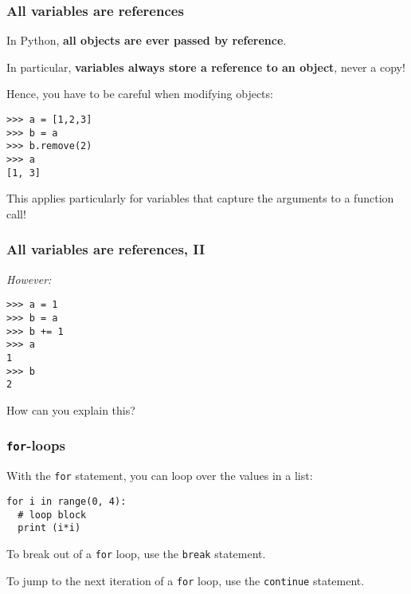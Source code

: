 \documentclass[english,serif,mathserif,xcolor=pdftex,dvipsnames,table]{beamer}
\begin{document}



\begin{frame}[fragile]
  \frametitle{All variables are references}

  In Python, \textbf{all objects are ever passed by reference}.

  \+
  In particular, \textbf{variables always store a reference to an
    object}, never a copy!

  \+
  Hence, you have to be careful when modifying objects:
\begin{lstlisting}
>>> a = [1,2,3]
>>> b = a
>>> b.remove(2)
>>> a
[1, 3]
\end{lstlisting}

  \+
  This applies particularly for variables that capture the arguments
  to a function call!
\end{frame}


\begin{frame}[fragile]
  \frametitle{All variables are references, II}
  \emph{However:}
\begin{lstlisting}
>>> a = 1
>>> b = a
>>> b += 1
>>> a
1
>>> b
2
\end{lstlisting}
  \begin{question}
    How can you explain this?  

  \end{question}
\end{frame}


\begin{frame}[fragile]
  \frametitle{\texttt{for}-loops}
    With the  \texttt{for} statement, you can loop over the values in
    a list:
\begin{lstlisting}
for i in range(0, 4):
  # loop block
  print (i*i)
\end{lstlisting}

  \+
  To break out of a \texttt{for} loop, use the \texttt{break}
  statement. 

  \+ 
  To jump to the next iteration of a \texttt{for} loop, use the
  \texttt{continue} statement.
\end{frame}
\end{document}
